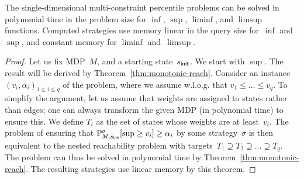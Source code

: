\documentclass{llncs}
\newcommand{\initState}{\ensuremath{s_{{\sf init}}} }
\newcommand*{\pr}{\mathbb{P}}
\begin{document}
\begin{theorem}
\label{thm:quant_reg_single_dim}
  The single-dimensional multi-constraint percentile problems can be solved in polynomial time in the problem size
  for $\inf$, $\sup$, $\liminf$, and $\limsup$ functions. Computed strategies use memory linear in the query size for~$\inf$ and $\sup$,
  and constant memory for $\liminf$ and~$\limsup$.
\end{theorem}
\begin{proof}
  Let us fix MDP~$M$, and a starting state~$\initState$. We start with $\sup$. The result will be derived by Theorem~\ref{thm:monotonic-reach}.
  Consider an instance $(v_i,\alpha_i)_{1\leq i\leq q}$ of the problem, where we assume w.l.o.g. that $v_1\leq \ldots\leq v_q$.
  To simplify the argument, let us assume that weights are assigned to states rather than edges;
  one can always transform the given MDP (in polynomial time) to ensure this.
  We define $T_i$ as the set of states whose weights are at least~$v_i$. The problem
  of ensuring that $\pr_{M,\initState}^\sigma[\sup \geq v_i]\geq \alpha_i$ by some strategy~$\sigma$ 
  is then equivalent to the nested reachability problem with targets~$T_1 \supseteq T_2 \supseteq \ldots \supseteq T_q$.
  The problem can thus be solved in polynomial time by Theorem~\ref{thm:monotonic-reach}.
  The resulting strategies use linear memory by this theorem.


\end{proof}
\end{document}
